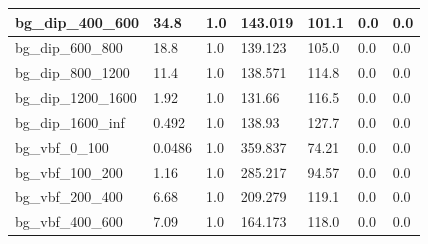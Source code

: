 \documentclass[a4paper, 10pt]{article}
\begin{document}
\begin{table}[H]
\begin{center}
\begin{tabular}{|m{23.0mm}|m{23.0mm}|m{18.0mm}|m{19.0mm}|m{19.0mm}|m{19.0mm}|m{19.0mm}|}
      \hline
      {\cellcolor{white}         bg\_dip\_400\_600}& {\cellcolor{white}         34.8}& {\cellcolor{white}         1.0}& {\cellcolor{white}         143.019}& {\cellcolor{white}         101.1}& {\cellcolor{green}         0.0}& {\cellcolor{green}         0.0}\\
      \hline
      {\cellcolor{white}         bg\_dip\_600\_800}& {\cellcolor{white}         18.8}& {\cellcolor{white}         1.0}& {\cellcolor{white}         139.123}& {\cellcolor{white}         105.0}& {\cellcolor{green}         0.0}& {\cellcolor{green}         0.0}\\
      \hline
      {\cellcolor{white}         bg\_dip\_800\_1200}& {\cellcolor{white}         11.4}& {\cellcolor{white}         1.0}& {\cellcolor{white}         138.571}& {\cellcolor{white}         114.8}& {\cellcolor{green}         0.0}& {\cellcolor{green}         0.0}\\
      \hline
      {\cellcolor{white}         bg\_dip\_1200\_1600}& {\cellcolor{white}         1.92}& {\cellcolor{white}         1.0}& {\cellcolor{white}         131.66}& {\cellcolor{white}         116.5}& {\cellcolor{green}         0.0}& {\cellcolor{green}         0.0}\\
      \hline
      {\cellcolor{white}         bg\_dip\_1600\_inf}& {\cellcolor{white}         0.492}& {\cellcolor{white}         1.0}& {\cellcolor{white}         138.93}& {\cellcolor{white}         127.7}& {\cellcolor{green}         0.0}& {\cellcolor{green}         0.0}\\
      \hline
      {\cellcolor{white}         bg\_vbf\_0\_100}& {\cellcolor{white}         0.0486}& {\cellcolor{white}         1.0}& {\cellcolor{white}         359.837}& {\cellcolor{white}         74.21}& {\cellcolor{green}         0.0}& {\cellcolor{green}         0.0}\\
      \hline
      {\cellcolor{white}         bg\_vbf\_100\_200}& {\cellcolor{white}         1.16}& {\cellcolor{white}         1.0}& {\cellcolor{white}         285.217}& {\cellcolor{white}         94.57}& {\cellcolor{green}         0.0}& {\cellcolor{green}         0.0}\\
      \hline
      {\cellcolor{white}         bg\_vbf\_200\_400}& {\cellcolor{white}         6.68}& {\cellcolor{white}         1.0}& {\cellcolor{white}         209.279}& {\cellcolor{white}         119.1}& {\cellcolor{green}         0.0}& {\cellcolor{green}         0.0}\\
      \hline
      {\cellcolor{white}         bg\_vbf\_400\_600}& {\cellcolor{white}         7.09}& {\cellcolor{white}         1.0}& {\cellcolor{white}         164.173}& {\cellcolor{white}         118.0}& {\cellcolor{green}         0.0}& {\cellcolor{green}         0.0}\\

\end{tabular}
\end{center}
\end{table}
\end{document}
